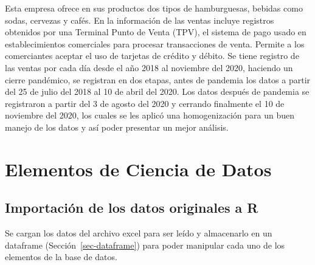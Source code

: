 \documentclass[
  us-letterpaper,
]{scrreprt}
\theoremstyle{definition}
\theoremstyle{plain}
\theoremstyle{plain}
\theoremstyle{remark}
\begin{document}
Esta empresa ofrece en sus productos dos tipos de hamburguesas, bebidas
como sodas, cervezas y cafés. En la información de las ventas incluye
registros obtenidos por una Terminal Punto de Venta (TPV), el sistema de
pago usado en establecimientos comerciales para procesar transacciones
de venta. Permite a los comerciantes aceptar el uso de tarjetas de
crédito y débito. Se tiene registro de las ventas por cada día desde el
año 2018 al noviembre del 2020, haciendo un cierre pandémico, se
registran en dos etapas, antes de pandemia los datos a partir del 25 de
julio del 2018 al 10 de abril del 2020. Los datos después de pandemia se
registraron a partir del 3 de agosto del 2020 y cerrando finalmente el
10 de noviembre del 2020, los cuales se les aplicó una homogenización
para un buen manejo de los datos y así poder presentar un mejor
análisis.

\section{Elementos de Ciencia de
Datos}\label{elementos-de-ciencia-de-datos}

\subsection{Importación de los datos originales a
R}\label{importaciuxf3n-de-los-datos-originales-a-r}

Se cargan los datos del archivo excel para ser leído y almacenarlo en un
dataframe (Sección~\ref{sec-dataframe}) para poder manipular cada uno de
los elementos de la base de datos.
\end{document}
